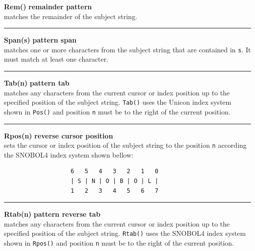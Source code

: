 \documentclass{article}
\begin{document}
\noindent\textbf{Rem()} \hfill\textbf{remainder pattern}\\
matches the remainder of the subject string.\\
\noindent\rule{15cm}{0.1pt}

\noindent\textbf{Span(s)} \hfill\textbf{pattern span}\\
matches one or more characters from the subject string that are contained in \texttt{s}.  It must match at least one character.\\
\noindent\rule{15cm}{0.1pt}

\noindent\textbf{Tab(n)} \hfill\textbf{pattern tab}\\
matches any characters from the current cursor or index position up to the specified position of the subject string.  \texttt{Tab()} uses the Unicon index system shown in \texttt{Pos()} and position \texttt{n} must be to the right of the current position.\\
\noindent\rule{15cm}{0.1pt}

\noindent\textbf{Rpos(n)} \hfill\textbf{reverse cursor position}\\
sets the cursor or index position of the subject string to the position \texttt{n} according the SNOBOL4 index system shown bellow:
\begin{verbatim}
                   6   5   4   3   2   1   0
                   | S | N | O | B | O | L |
                   1   2   3   4   5   6   7
\end{verbatim}
\noindent\rule{15cm}{0.1pt}

\noindent\textbf{Rtab(n)} \hfill\textbf{pattern reverse tab}\\
matches any characters from the current cursor or index position up to the specified position of the subject string.  \texttt{Rtab()} uses the SNOBOL4 index system shown in \texttt{Rpos()} and position \texttt{n} must be to the right of the current position.\\
\end{document}
